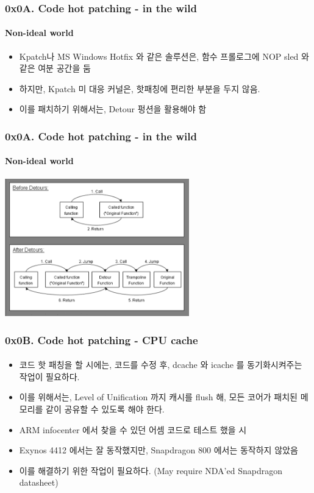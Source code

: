 \begin{frame}
  \frametitle{0x0A. Code hot patching - in the wild}
  \framesubtitle{Non-ideal world}

  \begin{itemize}
  \item <1-> Kpatch나 MS Windows Hotfix 와 같은 솔루션은, 함수 프롤로그에 NOP sled 와 같은 여분 공간을 둠
  \item <2-> 하지만, Kpatch 미 대응 커널은, 핫패칭에 편리한 부분을 두지 않음.
  \item <3-> 이를 패치하기 위해서는, Detour 펑션을 활용해야 함
  \end{itemize}
\end{frame}

\begin{frame}
  \frametitle{0x0A. Code hot patching - in the wild}
  \framesubtitle{Non-ideal world}

  \begin{center}
    \includegraphics [width=80mm]{img/detour_nagareshwar_securityxploded_com.png}\cite{codeinject}
  \end{center}
\end{frame}

\begin{frame}
  \frametitle{0x0B. Code hot patching - CPU cache}
  \framesubtitle{}

  \begin{itemize}
  \item <1-> 코드 핫 패칭을 할 시에는, 코드를 수정 후, dcache 와 icache 를 동기화시켜주는 작업이 필요하다.
  \item <2-> 이를 위해서는, Level of Unification 까지 캐시를 flush 해, 모든 코어가 패치된 메모리를 같이 공유할 수 있도록 해야 한다.
  \item <3-> ARM infocenter 에서 찾을 수 있던 어셈 코드\cite{cp15c7,cache}로 테스트 했을 시
  \item <4-> Exynos 4412 에서는 잘 동작했지만, Snapdragon 800 에서는 동작하지 않았음
  \item <5-> 이를 해결하기 위한 작업이 필요하다. (May require NDA'ed Snapdragon datasheet)
  \end{itemize}
\end{frame}


